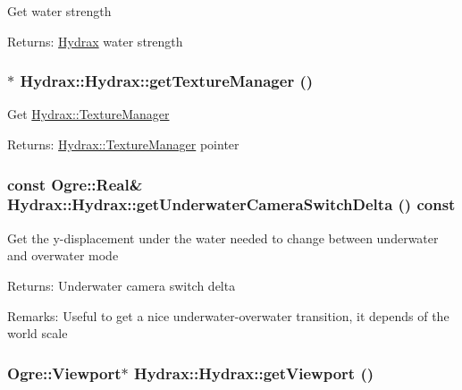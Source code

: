 Get water strength \begin{Desc}
\item[Returns:]\hyperlink{class_hydrax_1_1_hydrax}{Hydrax} water strength \end{Desc}
\hypertarget{class_hydrax_1_1_hydrax_d2f92d6e7d0feabcd66d405a7c8d8bc8}{
\subsubsection[{getTextureManager}]{$\ast$ Hydrax::Hydrax::getTextureManager ()}}
\label{class_hydrax_1_1_hydrax_d2f92d6e7d0feabcd66d405a7c8d8bc8}


Get \hyperlink{class_hydrax_1_1_texture_manager}{Hydrax::TextureManager} \begin{Desc}
\item[Returns:]\hyperlink{class_hydrax_1_1_texture_manager}{Hydrax::TextureManager} pointer \end{Desc}
\hypertarget{class_hydrax_1_1_hydrax_1626067a6e76d34ec5733da9f19615e0}{
\subsubsection[{getUnderwaterCameraSwitchDelta}]{\setlength{\rightskip}{0pt plus 5cm}const Ogre::Real\& Hydrax::Hydrax::getUnderwaterCameraSwitchDelta () const}}
\label{class_hydrax_1_1_hydrax_1626067a6e76d34ec5733da9f19615e0}


Get the y-displacement under the water needed to change between underwater and overwater mode \begin{Desc}
\item[Returns:]Underwater camera switch delta \end{Desc}
\begin{Desc}
\item[Remarks:]Useful to get a nice underwater-overwater transition, it depends of the world scale \end{Desc}
\hypertarget{class_hydrax_1_1_hydrax_969555d8f856a43c4ca6c92bb0958bf1}{
\subsubsection[{getViewport}]{\setlength{\rightskip}{0pt plus 5cm}Ogre::Viewport$\ast$ Hydrax::Hydrax::getViewport ()}}
\label{class_hydrax_1_1_hydrax_969555d8f856a43c4ca6c92bb0958bf1}


